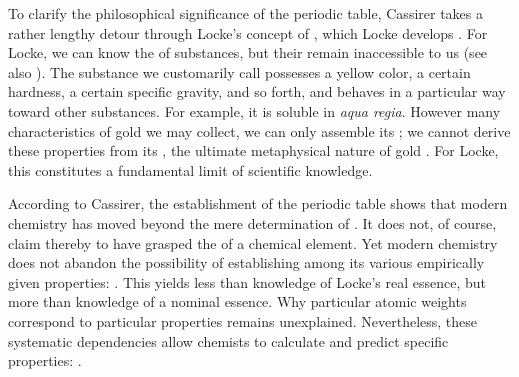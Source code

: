 \documentclass[submitted,12pt]{article}
\begin{document}
To clarify the philosophical significance of the periodic table, Cassirer takes a rather lengthy detour through Locke's concept of , which Locke develops  . For Locke, we can know the  of substances, but their  remain inaccessible to us (see also ). The substance we customarily call  possesses a yellow color, a certain hardness, a certain specific gravity, and so forth, and behaves in a particular way toward other substances. For example, it is soluble in \textit{aqua regia}. However many characteristics of gold we may collect, we can only assemble its ; we cannot derive these properties from its , the ultimate metaphysical nature of gold \citep[see][6.III]{Cassirer1907b}. For Locke, this constitutes a fundamental limit of scientific knowledge. 

According to Cassirer, the establishment of the periodic table shows that modern chemistry has moved beyond the mere determination of . It does not, of course, claim thereby to have grasped the  of a chemical element. Yet modern chemistry does not abandon the possibility of establishing  among its various empirically given properties:  . This yields less than knowledge of Locke's real essence, but more than knowledge of a nominal essence. Why particular atomic weights correspond to particular properties remains unexplained. Nevertheless, these systematic dependencies allow chemists to calculate and predict specific properties:  .
\end{document}
